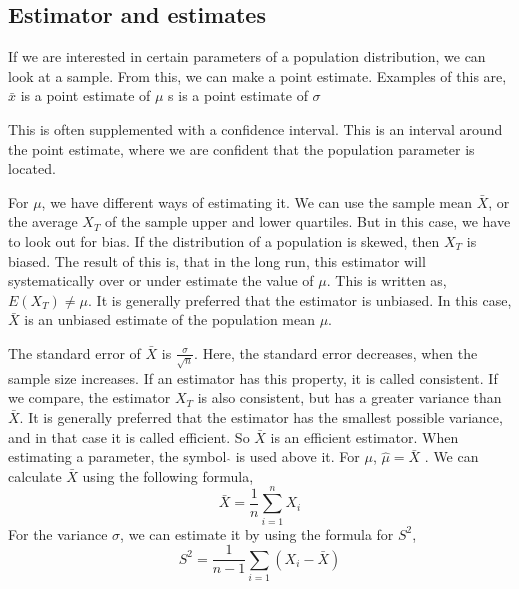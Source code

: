 \subsection{Estimator and estimates}
If we are interested in certain parameters of a population distribution, we can look at a sample. From this, we can make a point estimate. 
\newline
Examples of this are, 
\newline
$\bar{x}$ is a point estimate of $\mu$
\newline
s is a point estimate of $\sigma$
\newline

\noindent This is often supplemented with a confidence interval.
\newline
This is an interval around the point estimate, where we are confident that the population parameter is located.
\newline

\noindent For $\mu$, we have different ways of estimating it. We can use the sample mean $\bar{X}$, or the average $X_T$ of the sample upper and lower quartiles. 
But in this case, we have to look out for bias. If the distribution of a population is skewed, then $X_T$ is biased. The result of this is, that in the long run, this estimator will systematically over or under estimate the value of $\mu$. This is written as,
\newline
$E(X_T) \neq \mu$.
\newline
It is generally preferred that the estimator is unbiased. In this case, $\bar{X}$ is an unbiased estimate of the population mean $\mu$.
\newline

\noindent The standard error of $\bar{X}$ is $\frac{\sigma}{\sqrt{n}}$. Here, the standard error decreases, when the sample size increases. If an estimator has this property, it is called consistent. If we compare, the estimator $X_T$ is also consistent, but has a greater variance than $\bar{X}$. 
\newline
It is generally preferred that the estimator has the smallest possible variance, and in that case it is called efficient. So $\bar{X}$ is an efficient estimator.
\newline
When estimating a parameter, the symbol $\hat{}$ is used above it. For $\mu$, $\hat{\mu} = \bar{X}$ .
\newline
We can calculate $\bar{X}$ using the following formula,
$$\bar{X}=\frac{1}{n} \sum_{i=1}^{n}X_i$$   
\newline
For the variance $\sigma$, we can estimate it by using the formula for $S^2$,
$$S^2=\frac{1}{n-1} \sum_{i=1}(X_i-\bar{X})$$